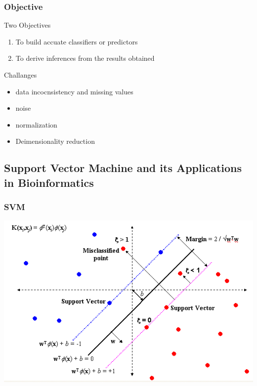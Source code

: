 \documentclass[UTF8]{beamer}\usepackage[]{graphicx}\usepackage[]{color}
\begin{document}
\begin{frame}
  \frametitle{Objective}
  \begin{block}{Two Objectives}
    \begin{enumerate}
      \item To build accuate classifiers or predictors
      \item To derive inferences from the results obtained
    \end{enumerate}
  \end{block}

  \begin{block}{Challanges}
    \begin{itemize}
      \item data incocnsistency and missing values
      \item noise
      \item normalization
      \item Deimensionality reduction
    \end{itemize}
  \end{block}
\end{frame}

\subsection{Support Vector Machine and its Applications in Bioinformatics}


\begin{frame}
  \frametitle{SVM}
\centerline{\includegraphics[height=.7\textheight]{svm.png}}
\end{frame}
\end{document}
